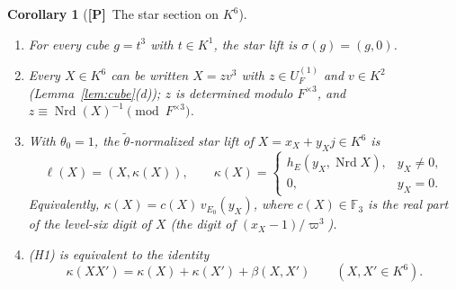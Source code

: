 \documentclass[11pt]{article}
\newcommand{\Fq}{\mathbb F}
\newcommand{\Nrd}{\operatorname{Nrd}}
\newcommand{\tth}{\widetilde\theta}
\newcommand{\Ptag}{\textnormal{\textbf{[P]}}}
\theoremstyle{plain}
\newtheorem{corollary}[theorem]{Corollary}
\theoremstyle{definition}
\begin{document}
\begin{corollary}[\Ptag\ The star section on $K^6$]\label{cor:starK6}
\begin{enumerate}[label=(\alph*)]
\item For every cube $g=t^3$ with $t\in K^1$, the star lift is
$\sigma(g)=(g,0)$.
\item Every $X\in K^6$ can be written $X=zv^3$ with $z\in U_F^{(1)}$ and
$v\in K^2$ (Lemma~\ref{lem:cube}(d)); $z$ is determined modulo $F^{\times3}$,
and $z\equiv\Nrd(X)^{-1}\pmod{F^{\times3}}$.
\item With $\theta_0=1$, the $\tth$-normalized star lift of $X=x_X+y_Xj\in K^6$ is
\begin{equation}\label{eq:ell}
 \ell(X)=(X,\kappa(X)),\qquad
 \kappa(X)=\begin{cases}h_E(y_X,\Nrd X),& y_X\ne0,\\ 0,& y_X=0.\end{cases}
\end{equation}
Equivalently, $\kappa(X)=c(X)\,v_{E_0}(y_X)$, where $c(X)\in\Fq_3$ is the
real part of the level-six digit of $X$ (the digit of $(x_X-1)/\varpi^3$).
\item (H1) is equivalent to the identity
\begin{equation}\label{eq:H1identity}
 \kappa(XX')=\kappa(X)+\kappa(X')+\beta(X,X')\qquad(X,X'\in K^6).
\end{equation}
\end{enumerate}
\end{corollary}
\end{document}
